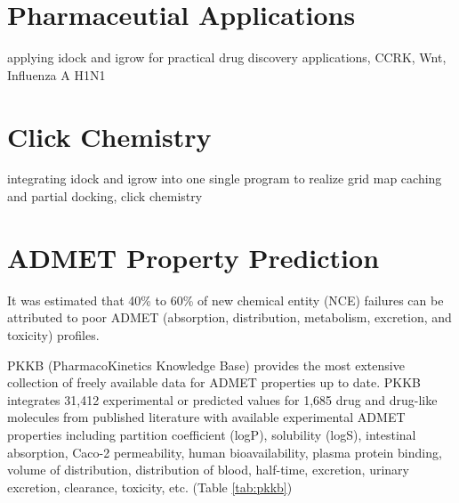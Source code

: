 \section{Pharmaceutial Applications}

applying idock and igrow for practical drug discovery applications, CCRK, Wnt, Influenza A H1N1

\section{Click Chemistry}

integrating idock and igrow into one single program to realize grid map caching and partial docking, click chemistry

\section{ADMET Property Prediction}

It was estimated that 40\% to 60\% of new chemical entity (NCE) failures can be attributed to poor ADMET (absorption, distribution, metabolism, excretion, and toxicity) profiles.

PKKB (PharmacoKinetics Knowledge Base) \citep{1133} provides the most extensive collection of freely available data for ADMET properties up to date. PKKB integrates 31,412 experimental or predicted values for 1,685 drug and drug-like molecules from published literature with available experimental ADMET properties including partition coefficient (logP), solubility (logS), intestinal absorption, Caco-2 permeability, human bioavailability, plasma protein binding, volume of distribution, distribution of blood, half-time, excretion, urinary excretion, clearance, toxicity, etc. (Table \ref{tab:pkkb})

